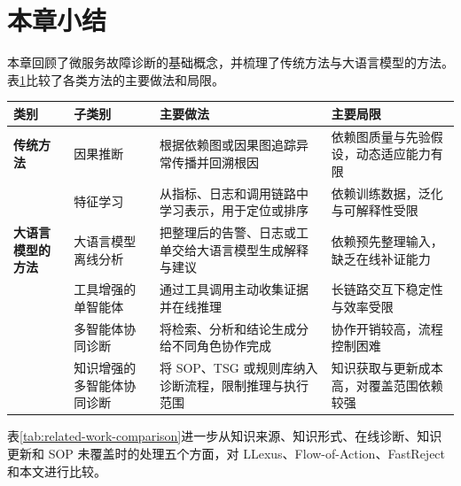 
\section{本章小结}

本章回顾了微服务故障诊断的基础概念，并梳理了传统方法与大语言模型的方法。表\ref{tab:methods-comparison}比较了各类方法的主要做法和局限。

\begin{table}[H]
\centering
{}
\label{tab:methods-comparison}
\renewcommand{\arraystretch}{1.3}
\small
\setlength{\tabcolsep}{5pt}
\begin{tabularx}{\textwidth}{>{\centering\arraybackslash}p{2.3cm}>{\centering\arraybackslash}p{2.1cm}>{\raggedright\arraybackslash}X>{\raggedright\arraybackslash}X}
\toprule
\rowcolor{lightgray!30}
\textbf{类别} & \textbf{子类别} & \textbf{主要做法} & \textbf{主要局限} \\
\midrule
\textbf{传统方法} & 因果推断 & 根据依赖图或因果图追踪异常传播并回溯根因 & 依赖图质量与先验假设，动态适应能力有限 \\
\cline{2-4}
& 特征学习 & 从指标、日志和调用链路中学习表示，用于定位或排序 & 依赖训练数据，泛化与可解释性受限 \\
\midrule
\textbf{大语言模型的方法} & 大语言模型离线分析 & 把整理后的告警、日志或工单交给大语言模型生成解释与建议 & 依赖预先整理输入，缺乏在线补证能力 \\
\cline{2-4}
& 工具增强的单智能体 & 通过工具调用主动收集证据并在线推理 & 长链路交互下稳定性与效率受限 \\
\cline{2-4}
& 多智能体协同诊断 & 将检索、分析和结论生成分给不同角色协作完成 & 协作开销较高，流程控制困难 \\
\cline{2-4}
& 知识增强的多智能体协同诊断 & 将 SOP、TSG 或规则库纳入诊断流程，限制推理与执行范围 & 知识获取与更新成本高，对覆盖范围依赖较强 \\
\bottomrule
\end{tabularx}
\setlength{\tabcolsep}{6pt}

\end{table}

表\ref{tab:related-work-comparison}进一步从知识来源、知识形式、在线诊断、知识更新和 SOP 未覆盖时的处理五个方面，对 LLexus、Flow-of-Action、FastReject 和本文进行比较。

